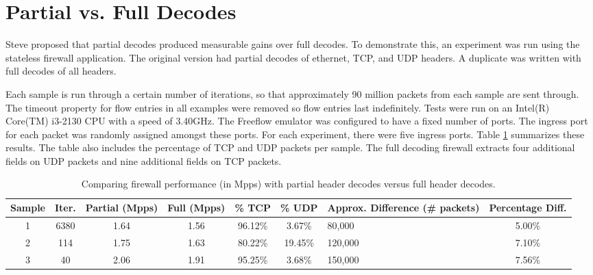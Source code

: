 \section{Partial vs. Full Decodes} \label{exp:decode_comparison}

Steve proposed that partial decodes produced measurable gains over full decodes. To demonstrate this, an experiment was run using the stateless firewall application. The original version had partial decodes of ethernet, TCP, and UDP headers. A duplicate was written with full decodes of all headers.

Each sample is run through a certain number of iterations, so that approximately 90 million packets from each sample are sent through.
The timeout property for flow entries in all examples were removed so flow entries last indefinitely. Tests were run on an Intel(R) Core(TM) i3-2130 CPU with a speed of 3.40GHz.
The Freeflow emulator was configured to have a fixed number of ports. The ingress port for each packet was randomly assigned amongst these ports. For each experiment, there were five ingress ports. 
Table \ref{tbl:firewall_cmp} summarizes these results. The table also includes the percentage of TCP and UDP packets per sample. The full decoding firewall extracts four additional fields on UDP packets and nine additional fields on TCP packets. 

\begin{table}[ht]
\caption{Comparing firewall performance (in Mpps) with partial header decodes versus full header decodes.}
\begin{center}
\begin{tabularx}{\linewidth}{| c || c | c | c | c | c | X | c |}
\hline
Sample & Iter. & Partial (Mpps) & Full (Mpps) & \% TCP & \% UDP & Approx. Difference (\# packets) & Percentage Diff. \\
\hline
1 & 6380 & 1.64 & 1.56 & 96.12\% & 3.67\% & 80,000 & 5.00\% \\
\hline
2 & 114 & 1.75 & 1.63 & 80.22\% & 19.45\% & 120,000 & 7.10\% \\
\hline
3 & 40 & 2.06 & 1.91 & 95.25\% & 3.68\% & 150,000 & 7.56\% \\ 
\hline
\end{tabularx}
\end{center}
\label{tbl:firewall_cmp}
\end{table}



